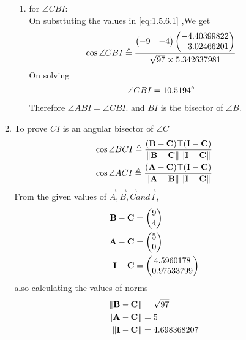 \documentclass[11pt]{book}
\begin{document}
\begin{enumerate}[label=\thesection.\arabic*.,ref=\thesection.\theenumi]
\begin{enumerate}
\begin{enumerate}
       \item for $\angle CBI$: \\
    On substtuting the values in  \eqref{eq:1.5.6.1} ,We get 
    \begin{align}
        \cos{\angle CBI} \triangleq \frac{\begin{pmatrix} -9 & -4\end{pmatrix}\begin{pmatrix}-4.40399822 \\ -3.02466201\end{pmatrix}}{ \sqrt{97} \times 5.342637981} \\
    \end{align}
    On solving 
    \begin{align}
        \angle CBI = 10.5194\degree
    \end{align}
    Therefore $\angle ABI = \angle CBI.$ and $BI$ is the bisector of $\angle B$. 
\end{enumerate}

    \item To prove $CI$ is an angular bisector of $ \angle C$
\begin{align}
\label{eq:1.5.6.18}
\cos{\angle BCI} \triangleq \frac{(\vec{B}-\vec{C})\top(\vec{I}-\vec{C})}{\norm{\vec{B}-\vec{C}}\norm{\vec{I}-\vec{C}}} \\
\cos{\angle ACI} \triangleq \frac{(\vec{A}-\vec{C})\top(\vec{I}-\vec{C})}{\norm{\vec{A}-\vec{B}}\norm{\vec{I}-\vec{C}}} 
\end{align}
From the given values of $\vec{A},\vec{B},\vec{C} and \vec{I}$,\\
\begin{align}
	\mathbf{B}-\mathbf{C} &=\begin{pmatrix}9\\4\end{pmatrix} \\
	\mathbf{A}-\mathbf{C}&= \begin{pmatrix}5\\0\end{pmatrix} \\
 \mathbf{I}-\mathbf{C}  &=\begin{pmatrix}4.5960178 \\ 0.97533799\end{pmatrix}
\end{align}
also calculating the values of norms
\begin{align}
	\left\lVert\mathbf{B}-\mathbf{C}\right\rVert &=\sqrt{97} \\
	\left\lVert\mathbf{A}-\mathbf{C}\right\rVert &= 5 \\
 	\left\lVert\mathbf{I}-\mathbf{C}\right\rVert &= 4.698368207 \\
\end{align}


\end{enumerate}
\end{enumerate}
\end{document}
